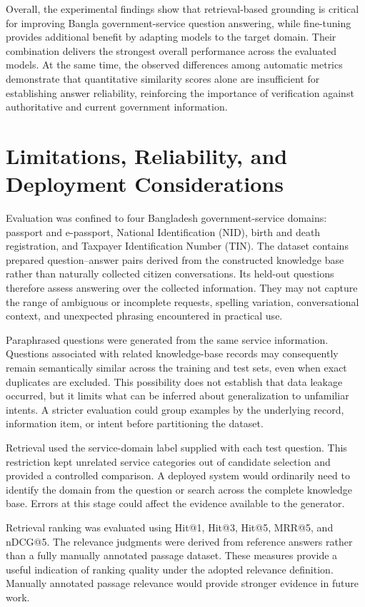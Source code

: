 \documentclass[10pt,journal,compsoc]{IEEEtran}
\begin{document}
Overall, the experimental findings show that retrieval-based grounding is
critical for improving Bangla government-service question answering, while
fine-tuning provides additional benefit by adapting models to the target
domain. Their combination delivers the strongest overall performance across
the evaluated models. At the same time, the observed differences among
automatic metrics demonstrate that quantitative similarity scores alone are
insufficient for establishing answer reliability, reinforcing the importance
of verification against authoritative and current government information.

\section{Limitations, Reliability, and Deployment Considerations}
\label{sec:limitations}

Evaluation was confined to four Bangladesh government-service domains: passport and e-passport, National Identification (NID), birth and death registration, and Taxpayer Identification Number (TIN). The dataset contains prepared question--answer pairs derived from the constructed knowledge base rather than naturally collected citizen conversations. Its held-out questions therefore assess answering over the collected information. They may not capture the range of ambiguous or incomplete requests, spelling variation, conversational context, and unexpected phrasing encountered in practical use.

Paraphrased questions were generated from the same service information. Questions associated with related knowledge-base records may consequently remain semantically similar across the training and test sets, even when exact duplicates are excluded. This possibility does not establish that data leakage occurred, but it limits what can be inferred about generalization to unfamiliar intents. A stricter evaluation could group examples by the underlying record, information item, or intent before partitioning the dataset.

Retrieval used the service-domain label supplied with each test question. This restriction kept unrelated service categories out of candidate selection and provided a controlled comparison. A deployed system would ordinarily need to identify the domain from the question or search across the complete knowledge base. Errors at this stage could affect the evidence available to the generator.

Retrieval ranking was evaluated using Hit@1, Hit@3, Hit@5, MRR@5, and nDCG@5. The relevance judgments were derived from reference answers rather than a fully manually annotated passage dataset. These measures provide a useful indication of ranking quality under the adopted relevance definition. Manually annotated passage relevance would provide stronger evidence in future work.
\end{document}
